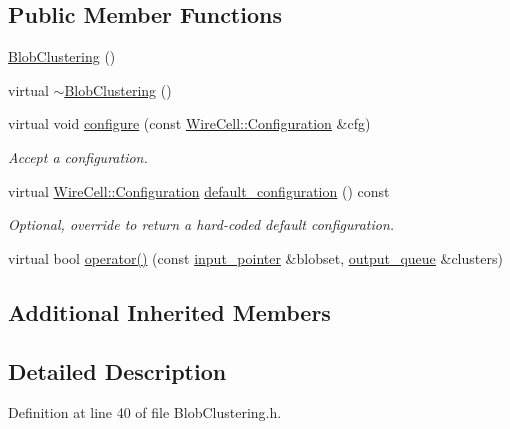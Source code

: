 \subsection*{Public Member Functions}
\begin{DoxyCompactItemize}
\item 
\hyperlink{class_wire_cell_1_1_img_1_1_blob_clustering_a8d746e50bc5972177530f40742f2f4e6}{Blob\+Clustering} ()
\item 
virtual \hyperlink{class_wire_cell_1_1_img_1_1_blob_clustering_a56565780fb101e69d24d91d5648461f8}{$\sim$\+Blob\+Clustering} ()
\item 
virtual void \hyperlink{class_wire_cell_1_1_img_1_1_blob_clustering_a8a922ee3796a48d0608ce034dad340fb}{configure} (const \hyperlink{namespace_wire_cell_a9f705541fc1d46c608b3d32c182333ee}{Wire\+Cell\+::\+Configuration} \&cfg)
\begin{DoxyCompactList}\small\item\em Accept a configuration. \end{DoxyCompactList}\item 
virtual \hyperlink{namespace_wire_cell_a9f705541fc1d46c608b3d32c182333ee}{Wire\+Cell\+::\+Configuration} \hyperlink{class_wire_cell_1_1_img_1_1_blob_clustering_a9833b4248ce1a3b6564d42b6d256877b}{default\+\_\+configuration} () const
\begin{DoxyCompactList}\small\item\em Optional, override to return a hard-\/coded default configuration. \end{DoxyCompactList}\item 
virtual bool \hyperlink{class_wire_cell_1_1_img_1_1_blob_clustering_ad2438afe5fd058260e8301690ae5731f}{operator()} (const \hyperlink{class_wire_cell_1_1_i_queuedout_node_acf5f716a764553f3c7055a9cf67e906e}{input\+\_\+pointer} \&blobset, \hyperlink{class_wire_cell_1_1_i_queuedout_node_a39018e4e3dd886befac9636ac791a685}{output\+\_\+queue} \&clusters)
\end{DoxyCompactItemize}
\subsection*{Additional Inherited Members}


\subsection{Detailed Description}


Definition at line 40 of file Blob\+Clustering.\+h.



